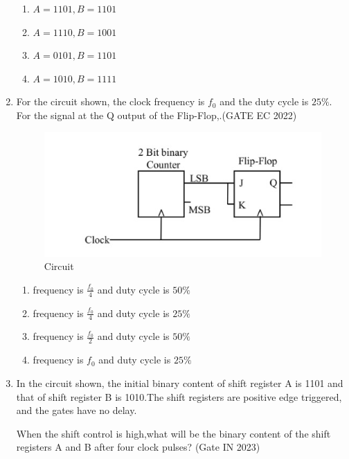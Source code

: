 \begin{enumerate}
\begin{enumerate}
\item $A= 1101,B=1101$
\item $A=1110 ,B=1001$
\item $A=0101 ,B=1101$
\item $A=1010 ,B=1111$
\end {enumerate}
\item For the circuit shown, the clock frequency is $f_0$ and the duty cycle is $25\%$. For the signal at the Q output of the Flip-Flop,\underline{\hspace{20pt}}.\hfill(GATE EC 2022)
		\begin{figure}[h]
			\centering
			\includegraphics[width=\columnwidth]{ide/7474/figs/gate_image_new.jpg}
			\caption{Circuit}
			\label{fig:new_gate}
		\end{figure}
			\begin{enumerate}
			\item frequency is $\frac{{f_0}}{4}$ and duty cycle is $50\%$
			\item frequency is $\frac{{f_0}}{4}$ and duty cycle is $25\%$
			\item frequency is $\frac{{f_0}}{2}$ and duty cycle is $50\%$
			\item frequency is ${f_0}$ and duty cycle is $25\%$
		\end{enumerate}
\item In the circuit shown, the initial binary content of shift register A is 1101 and that of shift register B is 1010.The shift registers are positive edge triggered, and the gates have no delay.

When the shift control is high,what will be the binary content of the shift registers A and B after four clock pulses?
\hfill{(Gate IN 2023)}


\end{enumerate}
